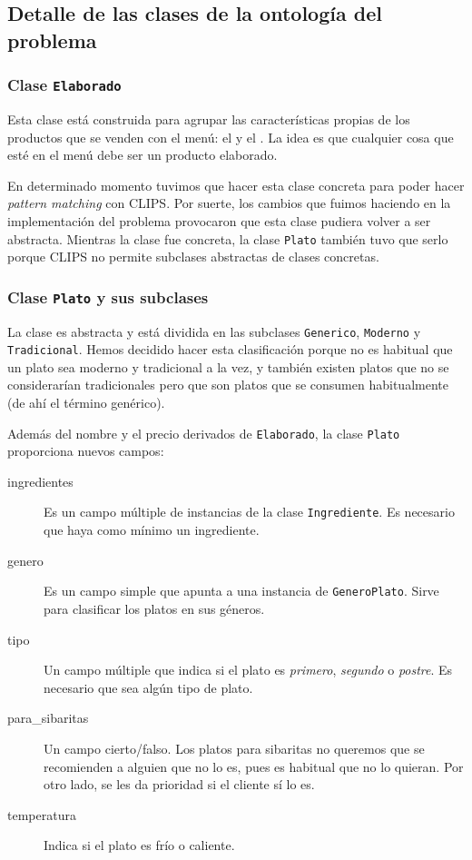 \subsection{Detalle de las clases de la ontología del problema}
\subsubsection{Clase \texttt{Elaborado}}
Esta clase está construida para agrupar las características propias de los
productos que se venden con el menú: el  y el
. La idea es que cualquier cosa que esté en el menú debe ser un
producto elaborado.

En determinado momento tuvimos que hacer esta clase concreta para poder hacer
\emph{pattern matching} con CLIPS. Por suerte, los cambios que fuimos haciendo
en la implementación del problema provocaron que esta clase pudiera volver a
ser abstracta. Mientras la clase fue concreta, la clase \verb+Plato+ también
tuvo que serlo porque CLIPS no permite subclases abstractas de clases
concretas.

\subsubsection{Clase \texttt{Plato} y sus subclases}
La clase es abstracta y está dividida en las subclases \verb+Generico+,
\verb+Moderno+ y \verb+Tradicional+. Hemos decidido hacer esta clasificación
porque no es habitual que un plato sea moderno y tradicional a la vez, y
también existen platos que no se considerarían tradicionales pero que son
platos que se consumen habitualmente (de ahí el término genérico).

Además del nombre y el precio derivados de \verb+Elaborado+, la clase
\verb+Plato+ proporciona nuevos campos:
\begin{description}
\item[ingredientes] Es un campo múltiple de instancias de la clase
  \verb+Ingrediente+. Es necesario que haya como mínimo un ingrediente.
\item[genero] Es un campo simple que apunta a una instancia de
  \verb+GeneroPlato+. Sirve para clasificar los platos en sus géneros.
\item[tipo] Un campo múltiple que indica si el plato es \emph{primero},
  \emph{segundo} o \emph{postre}. Es necesario que sea algún tipo de plato.
\item[para\_sibaritas] Un campo cierto/falso. Los platos para sibaritas no
  queremos que se recomienden a alguien que no lo es, pues es habitual que no
  lo quieran. Por otro lado, se les da prioridad si el cliente sí lo es.
\item[temperatura] Indica si el plato es frío o caliente.
\end{description}
